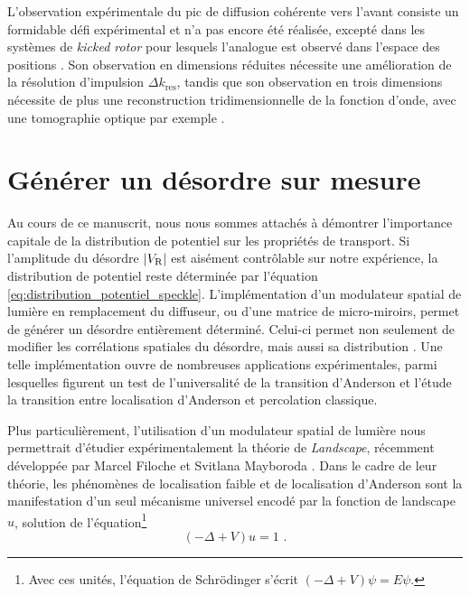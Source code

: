 L'observation expérimentale du pic de diffusion cohérente vers l'avant consiste un formidable défi expérimental et n'a pas encore été réalisée, excepté dans les systèmes de \emph{kicked rotor} pour lesquels l'analogue est observé dans l'espace des positions \citep{hainaut2018controlling}. Son observation en dimensions réduites nécessite une amélioration de la résolution d'impulsion $\Delta k_{\mathrm{res}}$, tandis que son observation en trois dimensions nécessite de plus une reconstruction tridimensionnelle de la fonction d'onde, avec une tomographie optique par exemple \citep{brantut2008light}. 







\section{Générer un désordre sur mesure} 
Au cours de ce manuscrit, nous nous sommes attachés à démontrer l'importance capitale de la distribution de potentiel sur les propriétés de transport. Si l'amplitude du désordre $|V_{\mathrm{R}}|$ est aisément contrôlable sur notre expérience, la distribution de potentiel reste déterminée par l'équation \ref{eq:distribution_potentiel_speckle}. L'implémentation d'un modulateur spatial de lumière en remplacement du diffuseur, ou d'une matrice de micro-miroirs, permet de générer un désordre entièrement déterminé. Celui-ci permet non seulement de modifier les corrélations spatiales du désordre, mais aussi sa distribution \citep{bender2018customizing}. Une telle implémentation ouvre de nombreuses applications expérimentales, parmi lesquelles figurent un test de l'universalité de la transition d'Anderson et l'étude la transition entre localisation d'Anderson et percolation classique. 

Plus particulièrement, l'utilisation d'un modulateur spatial de lumière nous permettrait d'étudier expérimentalement la théorie de \emph{Landscape}, récemment développée par Marcel Filoche et Svitlana Mayboroda \citep{filoche2012universal}. Dans le cadre de leur théorie, les phénomènes de localisation faible et de localisation d'Anderson sont la manifestation d'un seul mécanisme universel encodé par la fonction de landscape $u$, solution de l'équation\footnote{Avec ces unités, l'équation de Schrödinger s'écrit $(-\Delta+V)\psi=E\psi$.}
\begin{equation}
(-\Delta+V)u=1 \text{ .}
\label{eq:landscape}
\end{equation}

